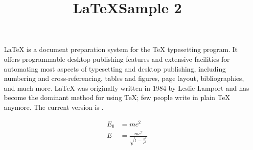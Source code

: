 \documentclass{article}
\title{\LaTeX Sample 2}
\begin{document}
\maketitle
\LaTeX{} is a document preparation system for
the \TeX{} typesetting program. It offers
programmable desktop publishing features and
extensive facilities for automating most
aspects of typesetting and desktop publishing,
including numbering and  cross-referencing,
tables and figures, page layout,
bibliographies, and much more. \LaTeX{} was
originally written in 1984 by Leslie Lamport
and has become the  dominant method for using
\TeX; few people write in plain \TeX{} anymore.
The current version is \LaTeXe.

\begin{align}
E_0 &= mc^2 \\
E &= \frac{mc^2}{\sqrt{1-\frac{v^2}{c^2}}}
\end{align}  
\end{document}
